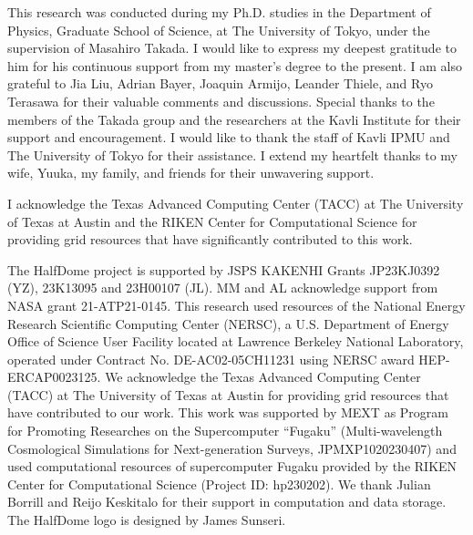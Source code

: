 
This research was conducted during my Ph.D. studies in the Department of Physics, Graduate School of Science, at The University of Tokyo, under the supervision of Masahiro Takada. I would like to express my deepest gratitude to him for his continuous support from my master's degree to the present. I am also grateful to Jia Liu, Adrian Bayer, Joaquin Armijo, Leander Thiele, and Ryo Terasawa for their valuable comments and discussions. Special thanks to the members of the Takada group and the researchers at the Kavli Institute for their support and encouragement. I would like to thank the staff of Kavli IPMU and The University of Tokyo for their assistance.
I extend my heartfelt thanks to my wife, Yuuka, my family, and friends for their unwavering support.

I acknowledge the Texas Advanced Computing Center (TACC) at The University of Texas at Austin and the RIKEN Center for Computational Science for providing grid resources that have significantly contributed to this work.

The HalfDome project is supported by JSPS KAKENHI Grants JP23KJ0392 (YZ), 23K13095 and 23H00107 (JL). MM and AL acknowledge support from NASA grant 21-ATP21-0145. This research used resources of the National Energy Research Scientific Computing Center (NERSC), a U.S. Department of Energy Office of Science User Facility located at Lawrence Berkeley National Laboratory, operated under Contract No. DE-AC02-05CH11231 using NERSC award HEP-ERCAP0023125. We acknowledge the Texas Advanced Computing Center (TACC) at The University of Texas at Austin for providing grid resources that have contributed to our work. This work was supported by MEXT as 
Program for Promoting Researches on the Supercomputer ``Fugaku'' (Multi-wavelength Cosmological Simulations for Next-generation Surveys, JPMXP1020230407) and used computational resources of supercomputer Fugaku provided by the RIKEN Center for Computational Science (Project ID: hp230202). We thank Julian Borrill and Reijo Keskitalo for their support in computation and data storage. The HalfDome logo is designed by James Sunseri.
